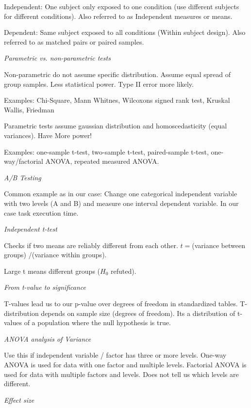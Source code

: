 Independent: One subject only exposed to one condition (use different subjects for different conditions). Also referred to as Independent measures or means. 

Dependent: Same subject exposed to all conditions (Within subject design). Also referred to as matched pairs or paired samples. \medskip


\textit{Parametric vs. non-parametric tests} \smallskip

Non-parametric do not assume specific distribution. Assume equal spread of group samples. Less statistical power. Type II error more likely. 

Examples: Chi-Square, Mann Whitnes, Wilcoxons signed rank test, Kruskal Wallis, Friedman \medskip

Parametric tests assume gaussian distribution and homoscedasticity (equal variances). Have More power!

Examples: one-sample t-test, two-sample t-test, paired-sample t-test, one-way/factorial ANOVA, repeated measured ANOVA. \medskip

\textit{A/B Testing} \smallskip

Common example as in our case: Change one categorical independent variable with two levels (A and B) and measure one interval dependent variable.
In our case task execution time. \medskip

\textit{Independent t-test} \smallskip

Checks if two means are reliably different from each other. $ t = $(variance between groups) /(variance within groups).

Large t means different groups ($H_0$ refuted). \medskip

\textit{From t-value to significance} \smallskip

T-values lead us to our p-value over degrees of freedom in standardized tables. 
T-distribution depends on sample size (degrees of freedom). Its a distribution of t-values of a population where the null hypothesis is true. \medskip

\columnbreak

\textit{ANOVA analysis of Variance} \smallskip

Use this if independent variable / factor has three or more levels. One-way ANOVA is used for data with one factor and multiple levels. 
Factorial ANOVA is used for data with multiple factors and levels. Does not tell us which levels are different. \medskip

\textit{Effect size} \smallskip

